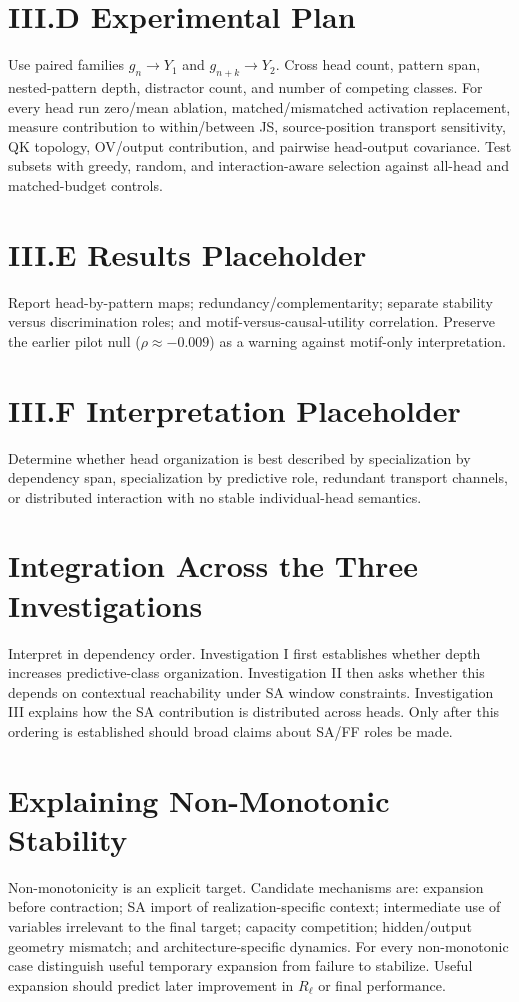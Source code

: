 \documentclass[10pt]{article}
\begin{document}
\section{III.D Experimental Plan}
Use paired families $g_n\to Y_1$ and $g_{n+k}\to Y_2$. Cross head count, pattern span, nested-pattern depth, distractor count, and number of competing classes. For every head run zero/mean ablation, matched/mismatched activation replacement, measure contribution to within/between JS, source-position transport sensitivity, QK topology, OV/output contribution, and pairwise head-output covariance. Test subsets with greedy, random, and interaction-aware selection against all-head and matched-budget controls.

\section{III.E Results Placeholder}
Report head-by-pattern maps; redundancy/complementarity; separate stability versus discrimination roles; and motif-versus-causal-utility correlation. Preserve the earlier pilot null ($\rho\approx -0.009$) as a warning against motif-only interpretation.

\section{III.F Interpretation Placeholder}
Determine whether head organization is best described by specialization by dependency span, specialization by predictive role, redundant transport channels, or distributed interaction with no stable individual-head semantics.

\section{Integration Across the Three Investigations}
Interpret in dependency order. Investigation I first establishes whether depth increases predictive-class organization. Investigation II then asks whether this depends on contextual reachability under SA window constraints. Investigation III explains how the SA contribution is distributed across heads. Only after this ordering is established should broad claims about SA/FF roles be made.

\section{Explaining Non-Monotonic Stability}
Non-monotonicity is an explicit target. Candidate mechanisms are: expansion before contraction; SA import of realization-specific context; intermediate use of variables irrelevant to the final target; capacity competition; hidden/output geometry mismatch; and architecture-specific dynamics. For every non-monotonic case distinguish useful temporary expansion from failure to stabilize. Useful expansion should predict later improvement in $R_\ell$ or final performance.
\end{document}
